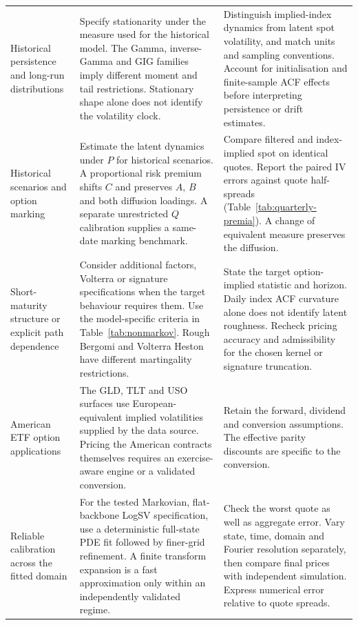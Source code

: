 \documentclass[11pt,a4paper]{article}
\theoremstyle{definition}
\theoremstyle{remark}
\begin{document}
{\begin{longtable}{@{}P{31mm}P{56mm}P{58mm}@{}}
\addlinespace
Historical persistence and long-run distributions & Specify stationarity under the measure used for the historical model. The Gamma, inverse-Gamma and GIG families imply different moment and tail restrictions. Stationary shape alone does not identify the volatility clock. & Distinguish implied-index dynamics from latent spot volatility, and match units and sampling conventions. Account for initialisation and finite-sample ACF effects before interpreting persistence or drift estimates.\\
\addlinespace
Historical scenarios and option marking & Estimate the latent dynamics under $P$ for historical scenarios. A proportional risk premium shifts $C$ and preserves $A$, $B$ and both diffusion loadings. A separate unrestricted $Q$ calibration supplies a same-date marking benchmark. & Compare filtered and index-implied spot on identical quotes. Report the paired IV errors against quote half-spreads (Table~\ref{tab:quarterly-premia}). A change of equivalent measure preserves the diffusion.\\
\addlinespace
Short-maturity structure or explicit path dependence & Consider additional factors, Volterra or signature specifications when the target behaviour requires them. Use the model-specific criteria in Table~\ref{tab:nonmarkov}. Rough Bergomi and Volterra Heston have different martingality restrictions. & State the target option-implied statistic and horizon. Daily index ACF curvature alone does not identify latent roughness. Recheck pricing accuracy and admissibility for the chosen kernel or signature truncation.\\
\addlinespace
American ETF option applications & The GLD, TLT and USO surfaces use European-equivalent implied volatilities supplied by the data source. Pricing the American contracts themselves requires an exercise-aware engine or a validated conversion. & Retain the forward, dividend and conversion assumptions. The effective parity discounts are specific to the conversion.\\
\addlinespace
Reliable calibration across the fitted domain & For the tested Markovian, flat-backbone LogSV specification, use a deterministic full-state PDE fit followed by finer-grid refinement. A finite transform expansion is a fast approximation only within an independently validated regime. & Check the worst quote as well as aggregate error. Vary state, time, domain and Fourier resolution separately, then compare final prices with independent simulation. Express numerical error relative to quote spreads.\\
\end{longtable}
}
\end{document}
